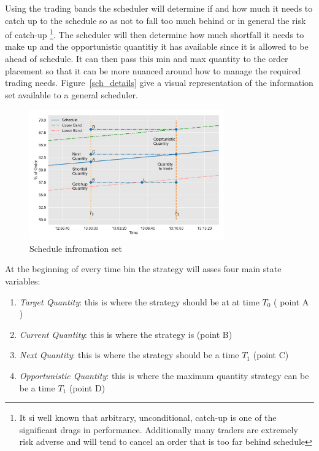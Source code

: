 Using the trading bands the scheduler will determine if and how much it needs to catch up to the schedule so as not to fall too much behind or in general the risk of catch-up \footnote{It si well known that arbitrary, unconditional, catch-up is one of the significant drags in performance. Additionally many traders are extremely risk adverse and will tend to cancel an order that is too far behind schedule}. The scheduler will then determine how much shortfall it needs to make up and the opportunistic quantitiy it has available since it is allowed to be ahead of schedule. It can then pass this min and max quantity to the order placement so that it can be more nuanced around how to manage the required trading needs. Figure~\ref{sch_details} give a visual representation of the information set available to a general scheduler.

\begin{figure}[!ht]
	\centering
	\includegraphics[width=0.75\textwidth]{chapters/chapter_exec_models/figures/schedule_details.png} 
	\caption{Schedule infromation set \label{fig:sch_details}}
	\end{figure}

At the beginning of every time bin the strategy will  asses four main state variables:

\begin{enumerate}
\item\emph{Target Quantity}: this is where the strategy should be at at time $T_0$ ( point A )
\item\emph{ Current Quantity}: this is where the strategy is (point B)
\item\emph{ Next Quantity}: this is where the strategy should be a time $T_1$ (point C)
\item\emph{ Opportunistic Quantity}: this is where the maximum quantity strategy can be be a time $T_1$ (point D)
\end{enumerate}

